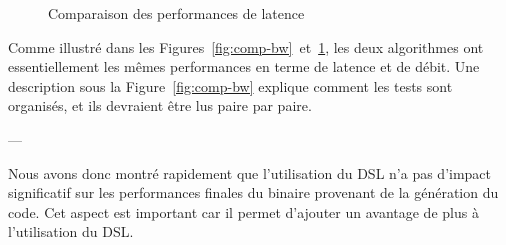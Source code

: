 \begin{figure}[h!t] \centering
    \caption{Comparaison des performances de latence}
    \label{fig:comp-lat}
\end{figure}

Comme illustré dans les Figures~\ref{fig:comp-bw}~et~\ref{fig:comp-lat}, les 
deux algorithmes ont essentiellement les mêmes performances en terme de latence 
et de débit. Une description sous la Figure~\ref{fig:comp-bw} explique comment 
les tests sont organisés, et ils devraient être lus paire par paire.

\begin{center}
---
\end{center}
    
Nous avons donc montré rapidement que l'utilisation du DSL n'a pas d'impact 
significatif sur les performances finales du binaire provenant de la 
génération du code. Cet aspect est important car il permet d'ajouter un 
avantage de plus à l'utilisation du DSL. 
